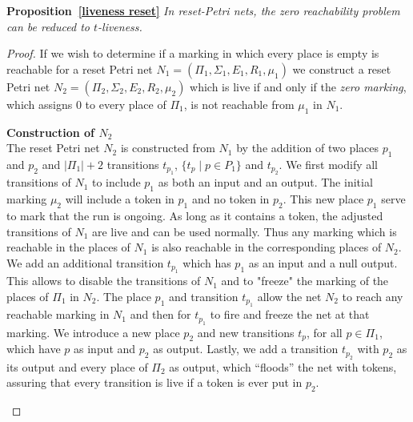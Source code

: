 \noindent
\textbf{Proposition~\ref{liveness reset}}
{\em In reset-Petri nets, the zero reachability problem can be reduced to {\sc $t$-liveness}.}



\begin{proof}


If we wish to determine if a marking in which every place is empty is reachable for a reset Petri net
 $N_1 = (\Pi_1, \Sigma_1, E_1, R_1, \mu_1)$ %
 we construct a reset Petri net
 $N_2 = (\Pi_2, \Sigma_2, E_2, R_2, \mu_2)$ %
  which is live if and only if the {\em zero marking}, which assigns $0$ to every place of $\Pi_1$, is not reachable from $\mu_1$ in $N_1$. \\

\begin{samepage}
{\bf Construction of $N_2$} \\
\indent
The reset Petri net $N_2$ is constructed from $N_1$ by the addition of two places $p_1$ and $p_2$ and $|\Pi_1| +2$ transitions $t_{p_1}$, $\{ t_p \mid p \in P_1 \}$ and $t_{p_2}$.
We first modify all transitions of $N_1$ to include $p_1$ as both an input and an output.
The initial marking $\mu_2$ will include a token in $p_1$ and no token in $p_2$. 
This new place $p_1$ serve to mark that the run is ongoing. As long as it contains a token, the adjusted transitions of $N_1$ are live and can be used normally. Thus any marking which is reachable in the places of $N_1$ is also reachable in the corresponding places of $N_2$.
We add an additional transition $t_{p_1}$ %
which has $p_1$ as an input and a null output.
This allows to disable the transitions of $N_1$ and to "freeze" the marking of the places of $\Pi_1$ in $N_2$.
 The place $p_1$ and transition $t_{p_1}$ allow the net $N_2$ to reach any reachable marking in $N_1$ and then for $t_{p_1}$ to fire and freeze the net at that marking.
We introduce a new place $p_2$ and new transitions $t_p$, for all $p \in \Pi_1$, which have $p$ as input and $p_2$ as output.
Lastly, we add a transition $t_{p_2}$ with $p_2$ as its output and every place of $\Pi_2$ as output, which ``floods'' the net with tokens, assuring that every transition is live if a token is ever
put in $p_2$.
\end{samepage}


\end{proof}
